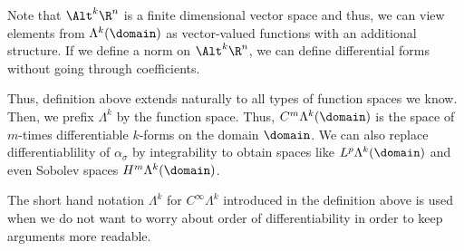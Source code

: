 \begin{remark}
  Note that $\Alt^k\R^n$ is a finite dimensional vector space and
  thus, we can view elements from $\Lambda^k(\domain)$ as
  vector-valued functions with an additional structure. If we define a
  norm on $\Alt^k\R^n$, we can define differential forms without going
  through coefficients.

  Thus, definition above extends naturally to all types of function
  spaces we know. Then, we prefix $\Lambda^k$ by the function
  space. Thus, $C^m\Lambda^k(\domain)$ is the space of $m$-times
  differentiable $k$-forms on the domain $\domain$.  We can also
  replace differentiablility of $\alpha_\sigma$ by integrability to
  obtain spaces like $L^p\Lambda^k(\domain)$ and even Sobolev spaces
  $H^m\Lambda^k(\domain)$.

  The short hand notation $\Lambda^k$ for $C^\infty\Lambda^k$
  introduced in the definition above is used when we do not want to
  worry about order of differentiability in order to keep arguments
  more readable.
\end{remark}

